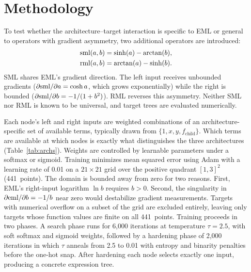\section{Methodology}
\label{sec:setup}

To test whether the architecture--target interaction is specific to
EML or general to operators with gradient asymmetry, two additional
operators are introduced:
\begin{align}
  \mathrm{sml}(a,b) &= \sinh(a) - \arctan(b), \label{eq:sml} \\
  \mathrm{rml}(a,b) &= \arctan(a) - \sinh(b). \label{eq:rml}
\end{align}
SML shares EML's gradient direction.  The left input receives
unbounded gradients ($\partial\mathrm{sml}/\partial a = \cosh a$, which
grows exponentially) while the right is bounded
($\partial\mathrm{sml}/\partial b = -1/(1+b^2)$).  RML reverses this
asymmetry.  Neither SML nor RML is known to be universal, and target trees are evaluated numerically.

Each node's left and right inputs are weighted combinations of
an architecture-specific set of available terms, typically drawn from
$\{1, x, y, f_{\text{child}}\}$.  Which terms are available at which
nodes is exactly what distinguishes the three architectures
(Table~\ref{tab:archs}).  Weights are controlled by learnable
parameters under a softmax or sigmoid.  Training minimizes mean
squared error using Adam with a learning rate
of 0.01 on a $21 \times 21$ grid over the positive quadrant
$[1,3]^2$ (441~points).  The domain is bounded away from zero
for two reasons.  First, EML's right-input logarithm $\ln b$
requires $b>0$.  Second, the singularity in
$\partial\mathrm{eml}/\partial b = -1/b$ near zero would destabilize
gradient measurements.  Targets with
numerical overflow on a subset of the grid are excluded entirely,
leaving only targets whose function values are finite on all
441~points.  Training proceeds in two phases.  A
search phase runs for 6{,}000 iterations at temperature $\tau = 2.5$, with
soft softmax and sigmoid weights, followed by a hardening phase
of 2{,}000 iterations in which $\tau$ anneals from 2.5 to 0.01 with entropy
and binarity penalties before the one-hot snap.  After hardening
each node selects exactly one input, producing a concrete
expression tree.

